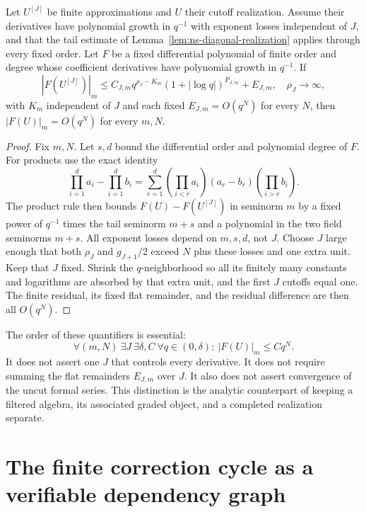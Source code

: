 \begin{proposition}
\label{prop:ns-residual-flatness}
Let $U^{[J]}$ be finite approximations and $U$ their cutoff realization.
Assume their derivatives have polynomial growth in $q^{-1}$ with
exponent losses independent of $J$, and that the tail estimate of
Lemma~\ref{lem:ns-diagonal-realization} applies through every fixed order.
Let $F$ be a fixed differential polynomial of finite order and degree whose
coefficient derivatives have polynomial growth in $q^{-1}$. If
\[
 |F(U^{[J]})|_m
 \leq C_{J,m}q^{\rho_J-K_m}(1+|\log q|)^{P_{J,m}}+E_{J,m},
 \quad \rho_J\to\infty,
\]
with $K_m$ independent of $J$ and each fixed $E_{J,m}=O(q^N)$ for every
$N$, then $|F(U)|_m=O(q^N)$ for every $m,N$.
\end{proposition}
\begin{proof}
Fix $m,N$. Let $s,d$ bound the differential order and polynomial degree
of $F$. For products use the exact identity
\[
 \prod_{i=1}^d a_i-\prod_{i=1}^d b_i
 =\sum_{r=1}^d
  \left(\prod_{i<r}a_i\right)(a_r-b_r)
  \left(\prod_{i>r}b_i\right).
\]
The product rule then bounds $F(U)-F(U^{[J]})$ in seminorm $m$ by a
fixed power of $q^{-1}$ times the tail seminorm $m+s$ and a polynomial
in the two field seminorms $m+s$. All exponent losses depend on $m,s,d$,
not $J$. Choose $J$ large enough that both $\rho_J$ and $g_{J+1}/2$
exceed $N$ plus these losses and one extra unit. Keep that $J$ fixed.
Shrink the $q$-neighborhood so all its finitely many constants and logarithms
are absorbed by that extra unit, and the first $J$ cutoffs equal one.
The finite residual, its fixed flat remainder, and the residual difference
are then all $O(q^N)$.
\end{proof}

The order of these quantifiers is essential:
\[
 \forall(m,N)\ \exists J\ \exists\delta,C\ 
  \forall q\in(0,\delta):\ |F(U)|_m\leq Cq^N.
\]
It does not assert one $J$ that controls every derivative. It does not
require summing the flat remainders $E_{J,m}$ over $J$. It also does not
assert convergence of the uncut formal series. This distinction is the
analytic counterpart of keeping a filtered algebra, its associated graded
object, and a completed realization separate.

\section{The finite correction cycle as a verifiable dependency graph}

